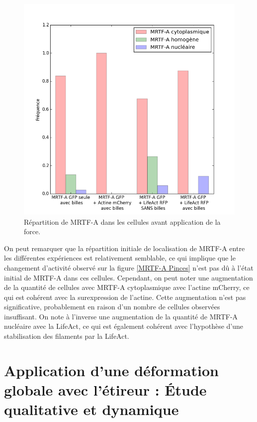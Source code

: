 \documentclass{report}
\begin{document}
\begin{figure}
\includegraphics[scale=0.4]{Figures/CHN_pinces.png} 
\caption{Répartition de MRTF-A dans les cellules avant application de la force. \label{CHN_pinces}}
\end{figure}

On peut remarquer que la répartition initiale de localisation de MRTF-A entre les différentes expériences est relativement semblable, ce qui implique que le changement d'activité observé sur la figure \ref{MRTF-A Pinces} n'est pas dû à l'état initial de MRTF-A dans ces cellules. 
Cependant, on peut noter une augmentation de la quantité de cellules avec MRTF-A cytoplasmique avec l'actine mCherry, ce qui est cohérent avec la surexpression de l'actine. Cette augmentation n'est pas significative, probablement en raison d'un nombre de cellules observées insuffisant. On note à l'inverse une augmentation de la quantité de MRTF-A nucléaire avec la LifeAct, ce qui est également cohérent avec l'hypothèse d'une stabilisation des filaments par la LifeAct. 

\section{Application d'une déformation globale avec l'étireur : \'Etude qualitative et dynamique}
\end{document}
